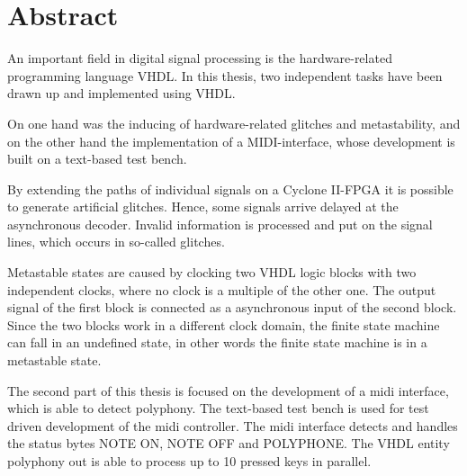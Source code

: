 
\chapter*{Abstract}\label{chap.abstract}

An important field in digital signal processing is the hardware-related programming language VHDL. In this thesis, two independent tasks have been drawn up and implemented using VHDL.

On one hand was the inducing of hardware-related glitches and metastability, and on the other hand the implementation of a MIDI-interface, whose development is built on a text-based test bench.

By extending the paths of individual signals on a Cyclone II-FPGA it is possible to generate artificial glitches. Hence, some signals arrive delayed at the asynchronous decoder. Invalid information is processed and put on the signal lines, which occurs in so-called glitches.

Metastable states are caused by clocking two VHDL logic blocks with two independent clocks, where no clock is a multiple of the other one. The output signal of the first block is connected as a asynchronous input of the second block. Since the two blocks work in a different clock domain, the finite state machine can fall in an undefined state, in other words the finite state machine is in a metastable state.

The second part of this thesis is focused on the development of a midi interface, which is able to detect polyphony. The text-based test bench is used for test driven development of the midi controller. The midi interface detects and handles the status bytes NOTE ON, NOTE OFF and POLYPHONE. The VHDL entity polyphony out is able to process up to 10 pressed keys in parallel.
